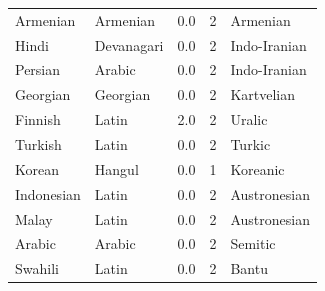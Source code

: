 \begin{table}[H]
\begin{tabular}{lllrl}
Armenian                  & Armenian   & 0.0 & 2 & Armenian     \\
Hindi                     & Devanagari & 0.0 & 2 & Indo-Iranian \\
Persian                   & Arabic     & 0.0 & 2 & Indo-Iranian \\
Georgian                  & Georgian   & 0.0 & 2 & Kartvelian   \\
Finnish                   & Latin      & 2.0 & 2 & Uralic       \\
Turkish                   & Latin      & 0.0 & 2 & Turkic       \\
Korean                    & Hangul     & 0.0 & 1 & Koreanic     \\
Indonesian                & Latin      & 0.0 & 2 & Austronesian \\
Malay                     & Latin      & 0.0 & 2 & Austronesian \\
Arabic                    & Arabic     & 0.0 & 2 & Semitic      \\
Swahili                   & Latin      & 0.0 & 2 & Bantu        \\
\bottomrule
\end{tabular}
\end{table}
